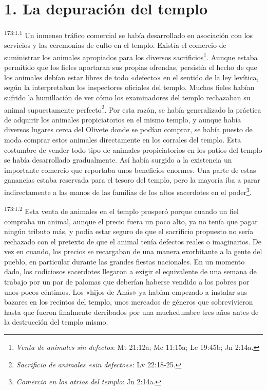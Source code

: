 \section*{1. La depuración del templo}
\par
\textsuperscript{173:1.1} Un inmenso tráfico comercial se había desarrollado en asociación con los servicios y las ceremonias de culto en el templo. Existía el comercio de suministrar los animales apropiados para los diversos sacrificios\footnote{\textit{Venta de animales sin defectos}: Mt 21:12a; Mc 11:15a; Lc 19:45b; Jn 2:14a.}. Aunque estaba permitido que los fieles aportaran sus propias ofrendas, persistía el hecho de que los animales debían estar libres de todo «defecto» en el sentido de la ley levítica, según la interpretaban los inspectores oficiales del templo. Muchos fieles habían sufrido la humillación de ver cómo los examinadores del templo rechazaban su animal supuestamente perfecto\footnote{\textit{Sacrificio de animales «sin defectos»}: Lv 22:18-25.}. Por esta razón, se había generalizado la práctica de adquirir los animales propiciatorios en el mismo templo, y aunque había diversos lugares cerca del Olivete donde se podían comprar, se había puesto de moda comprar estos animales directamente en los corrales del templo. Esta costumbre de vender todo tipo de animales propiciatorios en los patios del templo se había desarrollado gradualmente. Así había surgido a la existencia un importante comercio que reportaba unos beneficios enormes. Una parte de estas ganancias estaba reservada para el tesoro del templo, pero la mayoría iba a parar indirectamente a las manos de las familias de los altos sacerdotes en el poder\footnote{\textit{Comercio en los atrios del templo}: Jn 2:14a.}.

\par
\textsuperscript{173:1.2} Esta venta de animales en el templo prosperó porque cuando un fiel compraba un animal, aunque el precio fuera un poco alto, ya no tenía que pagar ningún tributo más, y podía estar seguro de que el sacrificio propuesto no sería rechazado con el pretexto de que el animal tenía defectos reales o imaginarios. De vez en cuando, los precios se recargaban de una manera exorbitante a la gente del pueblo, en particular durante las grandes fiestas nacionales. En un momento dado, los codiciosos sacerdotes llegaron a exigir el equivalente de una semana de trabajo por un par de palomas que deberían haberse vendido a los pobres por unos pocos céntimos. Los «hijos de Anás» ya habían empezado a instalar sus bazares en los recintos del templo, unos mercados de géneros que sobrevivieron hasta que fueron finalmente derribados por una muchedumbre tres años antes de la destrucción del templo mismo.

